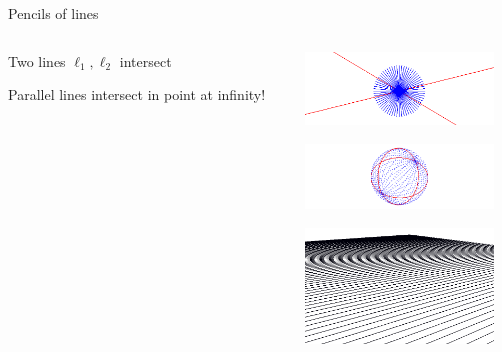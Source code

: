 \documentclass{beamer}
\begin{document}
\begin{frame}{Pencils of lines}
  \begin{columns}
    \begin{column}{5cm}
      Two lines $\ell_1, \ell_2$ intersect

      \bigskip

      Parallel lines intersect in point at infinity!
    \end{column}
    \begin{column}{5cm}
      \begin{center}
      \includegraphics[width=5cm]{pencil1}

      \includegraphics[width=5cm]{pencil2}

      \includegraphics[width=5cm]{pencil3}
    \end{center}
    \end{column}
  \end{columns}
\end{frame}
\end{document}
